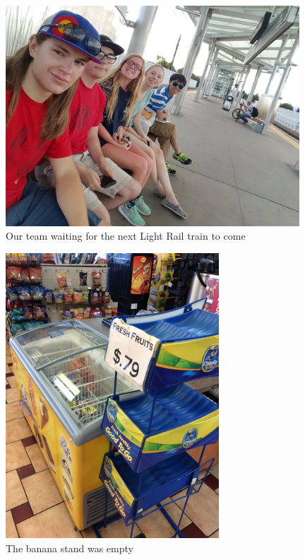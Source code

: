 \documentclass[11pt]{article}
\begin{document}
\begin{figure}[H]
    \centering
    \includegraphics[width=110mm]{resources/team.png}
    \caption{Our team waiting for the next Light Rail train to come}
\end{figure}

\begin{figure}[H]
    \centering
    \includegraphics[width=80mm]{resources/empty-banana-stand.jpg}
    \caption{The banana stand was empty}
\end{figure}
\end{document}
